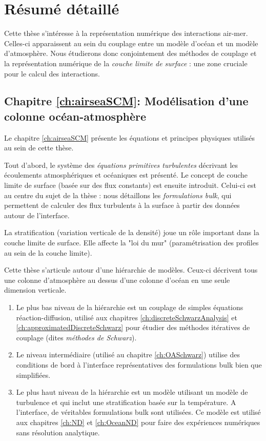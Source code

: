 \chapter*{Résumé détaillé}
Cette thèse s'intéresse à la représentation
numérique des interactions air-mer. Celles-ci apparaissent au sein
du couplage entre un modèle d'océan et un modèle d'atmosphère.
Nous étudierons donc conjointement des méthodes de couplage
et la représentation numérique de la
\textit{couche limite de surface} :
une zone cruciale pour le calcul des interactions.
\section*{Chapitre \ref{ch:airseaSCM}: Modélisation d'une colonne
océan-atmosphère}
Le chapitre \ref{ch:airseaSCM} présente les équations et
principes physiques utilisés
au sein de cette thèse.
\par
Tout d'abord, le système des \textit{équations primitives turbulentes}
décrivant les écoulements atmosphériques et océaniques est présenté.
Le concept de couche limite de surface
(basée sur des flux constants) est ensuite introduit.
Celui-ci est au centre du sujet de la thèse : nous détaillons les
\textit{formulations bulk}, qui permettent de calculer des flux
turbulents à la surface à partir des données autour de l'interface.
\par
La stratification (variation verticale de la densité) joue un rôle
important dans la couche limite de surface. Elle affecte la
"loi du mur" (paramétrisation des profiles au sein de la couche
limite).
\par
Cette thèse s'articule autour d'une hiérarchie de modèles. Ceux-ci
décrivent tous une colonne d'atmosphère au dessus d'une colonne
d'océan en une seule dimension verticale.
\par
\begin{enumerate}
	\item Le plus bas niveau de la hiérarchie est un couplage
	de simples équations réaction-diffusion, utilisé aux chapitres
		\ref{ch:discreteSchwarzAnalysis} et
		\ref{ch:approximatedDiscreteSchwarz} pour étudier des méthodes itératives de
		couplage (dites \textit{méthodes de Schwarz}).
	\item Le niveau intermédiaire (utilisé au chapitre \ref{ch:OASchwarz})
		utilise des conditions de bord
	à l'interface représentatives des formulations bulk bien
		que simplifiées.
\item Le plus haut niveau de la hiérarchie est un modèle utilisant
un modèle de turbulence et qui inclut une stratification basée sur
la température. A l'interface, de véritables formulations bulk
sont utilisées. Ce modèle est utilisé aux chapitres \ref{ch:ND}
	et \ref{ch:OceanND} pour
faire des expériences numériques sans résolution analytique.
\end{enumerate}
